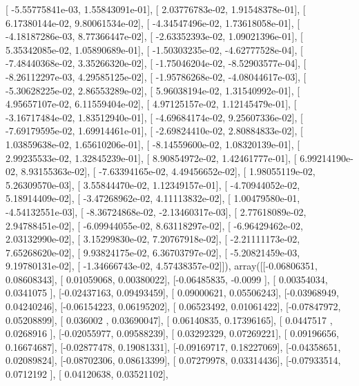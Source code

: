 \documentclass{article}
\begin{document}
       [ -5.55775841e-03,   1.55843091e-01],
       [  2.03776783e-02,   1.91548378e-01],
       [  6.17380144e-02,   9.80061534e-02],
       [ -4.34547496e-02,   1.73618058e-01],
       [ -4.18187286e-03,   8.77366447e-02],
       [ -2.63352393e-02,   1.09021396e-01],
       [  5.35342085e-02,   1.05890689e-01],
       [ -1.50303235e-02,  -4.62777528e-04],
       [ -7.48440368e-02,   3.35266320e-02],
       [ -1.75046204e-02,  -8.52903577e-04],
       [ -8.26112297e-03,   4.29585125e-02],
       [ -1.95786268e-02,  -4.08044617e-03],
       [ -5.30628225e-02,   2.86553289e-02],
       [  5.96038194e-02,   1.31540992e-01],
       [  4.95657107e-02,   6.11559404e-02],
       [  4.97125157e-02,   1.12145479e-01],
       [ -3.16717484e-02,   1.83512940e-01],
       [ -4.69684174e-02,   9.25607336e-02],
       [ -7.69179595e-02,   1.69914461e-01],
       [ -2.69824410e-02,   2.80884833e-02],
       [  1.03859638e-02,   1.65610206e-01],
       [ -8.14559600e-02,   1.08320139e-01],
       [  2.99235533e-02,   1.32845239e-01],
       [  8.90854972e-02,   1.42461777e-01],
       [  6.99214190e-02,   8.93155363e-02],
       [ -7.63394165e-02,   4.49456652e-02],
       [  1.98055119e-02,   5.26309570e-03],
       [  3.55844470e-02,   1.12349157e-01],
       [ -4.70944052e-02,   5.18914409e-02],
       [ -3.47268962e-02,   4.11113832e-02],
       [  1.00479580e-01,  -4.54132551e-03],
       [ -8.36724868e-02,  -2.13460317e-03],
       [  2.77618089e-02,   2.94788451e-02],
       [ -6.09944055e-02,   8.63118297e-02],
       [ -6.96429462e-02,   2.03132990e-02],
       [  3.15299830e-02,   7.20767918e-02],
       [ -2.21111173e-02,   7.65268620e-02],
       [  9.93824175e-02,   6.36703797e-02],
       [ -5.20821459e-03,   9.19780131e-02],
       [ -1.34666743e-02,   4.57438357e-02]]), array([[-0.06806351,  0.08608343],
       [ 0.01059068,  0.00380022],
       [-0.06485835, -0.0099    ],
       [ 0.00354034,  0.0341075 ],
       [-0.02437163,  0.09493459],
       [ 0.09000621,  0.05506243],
       [-0.03968949,  0.04240246],
       [-0.06154223,  0.06195202],
       [ 0.06523492,  0.01061422],
       [-0.07847972,  0.05208899],
       [ 0.036002  ,  0.03690047],
       [ 0.06140835,  0.17396165],
       [ 0.0447517 ,  0.0268916 ],
       [-0.02055977,  0.09588239],
       [ 0.03292329,  0.07269221],
       [ 0.09196656,  0.16674687],
       [-0.02877478,  0.19081331],
       [-0.09169717,  0.18227069],
       [-0.04358651,  0.02089824],
       [-0.08702306,  0.08613399],
       [ 0.07279978,  0.03314436],
       [-0.07933514,  0.0712192 ],
       [ 0.04120638,  0.03521102],
\end{document}
